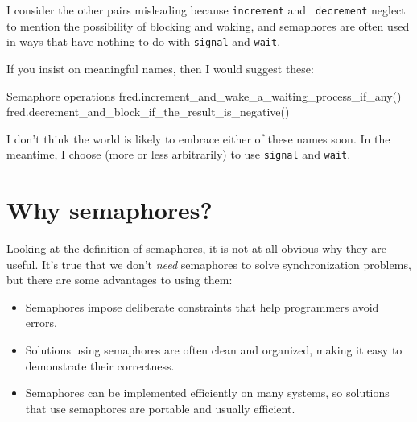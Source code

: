I consider the other pairs misleading because {\tt increment} and {\tt
decrement} neglect to mention the possibility of blocking and waking,
and semaphores are often used in ways that have nothing to do with
{\tt signal} and {\tt wait}.

If you insist on meaningful names, then I would suggest these:

\begin{lstbox}{Semaphore operations}
fred.increment_and_wake_a_waiting_process_if_any()
fred.decrement_and_block_if_the_result_is_negative()	
\end{lstbox}

I don't think the world is likely to embrace either of these names
soon.  In the meantime, I choose (more or less arbitrarily) to use
{\tt signal} and {\tt wait}.


\section{Why semaphores?}

Looking at the definition of semaphores, it is not at all obvious why
they are useful.  It's true that we don't {\em need} semaphores to
solve synchronization problems, but there are some advantages to using
them:

\begin{itemize}

\item Semaphores impose deliberate constraints that help
programmers avoid errors.

\item Solutions using semaphores are often clean and organized,
making it easy to demonstrate their correctness.

\item Semaphores can be implemented efficiently on many systems,
so solutions that use semaphores are portable and usually
efficient.

\end{itemize}
